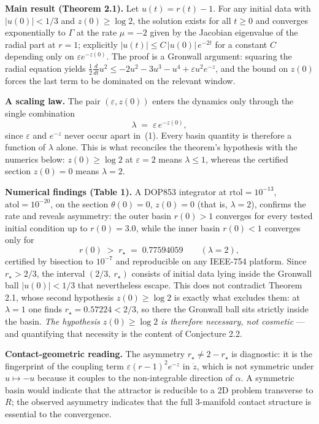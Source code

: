 \documentclass[11pt,a4paper]{article}
\theoremstyle{plain}
\newcommand{\rstar}{r_{\star}}
\begin{document}
\medskip
\noindent\textbf{Main result (Theorem 2.1).} Let $u(t) = r(t)-1$. For any initial data with
$|u(0)| < 1/3$ and $z(0) \ge \log 2$, the solution exists for all $t \ge 0$ and converges
exponentially to $\Gamma$ at the rate $\mu = -2$ given by the Jacobian eigenvalue of the radial part
at $r=1$; explicitly $|u(t)| \le C\,|u(0)|\,e^{-2t}$ for a constant $C$ depending only on
$\varepsilon e^{-z(0)}$. The proof is a Gronwall argument: squaring the radial equation yields
$\tfrac12 \tfrac{d}{dt}u^2 \le -2u^2 - 3u^3 - u^4 + \varepsilon u^2 e^{-z}$, and the bound on $z(0)$
forces the last term to be dominated on the relevant window.

\medskip
\noindent\textbf{A scaling law.} The pair $(\varepsilon, z(0))$ enters the dynamics only through the
single combination
\begin{equation}
  \lambda \;=\; \varepsilon\, e^{-z(0)},
\end{equation}
since $\varepsilon$ and $e^{-z}$ never occur apart in~(1). Every basin quantity is therefore a
function of $\lambda$ alone. This is what reconciles the theorem's hypothesis with the numerics
below: $z(0) \ge \log 2$ at $\varepsilon = 2$ means $\lambda \le 1$, whereas the certified section
$z(0)=0$ means $\lambda = 2$.

\medskip
\noindent\textbf{Numerical findings (Table 1).} A DOP853 integrator at
$\mathrm{rtol} = 10^{-13}$, $\mathrm{atol} = 10^{-20}$, on the section
$\theta(0)=0$, $z(0)=0$ (that is, $\lambda = 2$), confirms the rate and reveals
asymmetry: the outer basin $r(0)>1$ converges for every tested initial condition up to
$r(0) = 3.0$, while the inner basin $r(0)<1$ converges only for
\begin{equation}
  r(0) \;>\; \rstar \;=\; 0.77594059 \qquad (\lambda = 2),
\end{equation}
certified by bisection to $10^{-7}$ and reproducible on any IEEE-754 platform. Since
$\rstar > 2/3$, the interval $(2/3,\ \rstar)$ consists of initial data lying inside the Gronwall ball
$|u(0)|<1/3$ that nevertheless escape. This does not contradict Theorem 2.1, whose second hypothesis
$z(0)\ge\log 2$ is exactly what excludes them: at $\lambda = 1$ one finds
$\rstar = 0.57224 < 2/3$, so there the Gronwall ball sits strictly inside the basin. \emph{The
hypothesis $z(0)\ge\log 2$ is therefore necessary, not cosmetic} — and quantifying that necessity is
the content of Conjecture 2.2.

\medskip
\noindent\textbf{Contact-geometric reading.} The asymmetry $\rstar \ne 2-\rstar$ is diagnostic: it is
the fingerprint of the coupling term $\varepsilon(r-1)^2e^{-z}$ in $\dot z$, which is not symmetric
under $u \mapsto -u$ because it couples to the non-integrable direction of $\alpha$. A symmetric
basin would indicate that the attractor is reducible to a 2D problem transverse to $R$; the observed
asymmetry indicates that the full 3-manifold contact structure is essential to the convergence.
\end{document}
